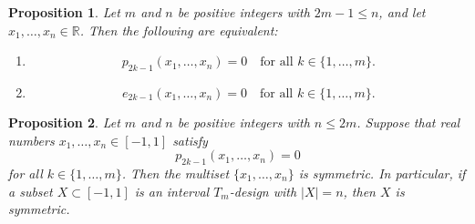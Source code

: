 \documentclass[10pt,a4paper]{amsart}
\newtheorem{prop}{Proposition}
\newcommand{\R}{\mathbb{R}}
\newcommand{\iantipodal}{symmetric}
\begin{document}
\begin{prop}
\label{prop:Newton1}
Let \( m \) and \( n \) be positive integers with \( 2m-1 \le n \), and let \( x_1,\ldots,x_n \in \R \). Then the following are equivalent:
\begin{enumerate}
\item\label{N1i1} 
\[
p_{2k-1}(x_1,\ldots,x_n) = 0 \quad \text{for all } k\in\{1,\dots,m\}.
\]
\item\label{N1i2}
\[
e_{2k-1}(x_1,\ldots,x_n) = 0 \quad \text{for all } k\in\{1,\dots,m\}.
\]
\end{enumerate}
\end{prop}

\begin{prop}
\label{prop:antipodal2}
Let \( m \) and \( n \) be positive integers with \( n\le 2m \). Suppose that real numbers \( x_1,\dots,x_n\in[-1,1] \) satisfy
\begin{equation}\label{xi2k-1}
p_{2k-1}(x_1,\dots,x_n)=0
\end{equation}
for all \( k\in\{1,\dots,m\} \). Then the multiset \(\{x_1,\dots,x_n\}\) is \iantipodal. In particular, if a subset \( X\subset[-1,1] \) is an interval \( T_m \)-design with \(|X|=n\), 
then \( X \) is \iantipodal.
\end{prop}
\end{document}
